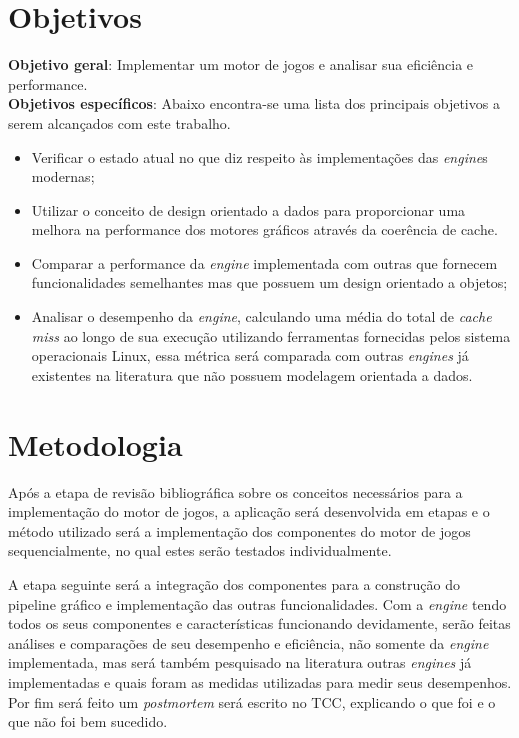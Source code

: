 \documentclass[11pt]{article}
\begin{document}
\section{Objetivos}
\label{obj}

\textbf{Objetivo geral}: Implementar um motor de jogos e analisar sua eficiência e performance.\\

\noindent\textbf{Objetivos específicos}: 
Abaixo encontra-se uma lista dos principais objetivos a serem alcançados com este trabalho.
\begin{itemize}
    \item Verificar o estado atual no que diz respeito às implementações das \textit{engine}s modernas;
    \item Utilizar o conceito de design orientado a dados para proporcionar uma melhora
        na performance dos motores gráficos através da coerência de cache.
    \item Comparar a performance da \textit{engine} implementada com outras que fornecem funcionalidades semelhantes mas
        que possuem um design orientado a objetos;
    \item Analisar o desempenho da \textit{engine}, calculando uma média do total de \textit{cache miss} ao longo de sua 
        execução utilizando ferramentas fornecidas pelos sistema operacionais Linux, essa métrica será comparada com outras
        \textit{engines} já existentes na literatura que não possuem modelagem orientada a dados.
\end{itemize}

\section{Metodologia}
\label{met}

Após a etapa de revisão bibliográfica sobre 
os conceitos necessários para a implementação do motor de jogos, a aplicação será desenvolvida em etapas e o 
método utilizado será a implementação dos componentes do motor de jogos sequencialmente, no qual estes 
serão testados individualmente.

A etapa seguinte será a integração dos componentes para a construção do pipeline gráfico e implementação 
das outras funcionalidades. Com a \textit{engine} tendo todos os seus componentes e características funcionando devidamente,
serão feitas análises e comparações de seu desempenho e eficiência, não somente da \textit{engine} implementada, mas será 
também pesquisado na literatura outras \textit{engines} já implementadas e quais foram as medidas utilizadas para medir seus 
desempenhos. Por fim será feito um \textit{postmortem} será escrito no TCC, explicando o que foi e o que não foi bem sucedido.
\end{document}
